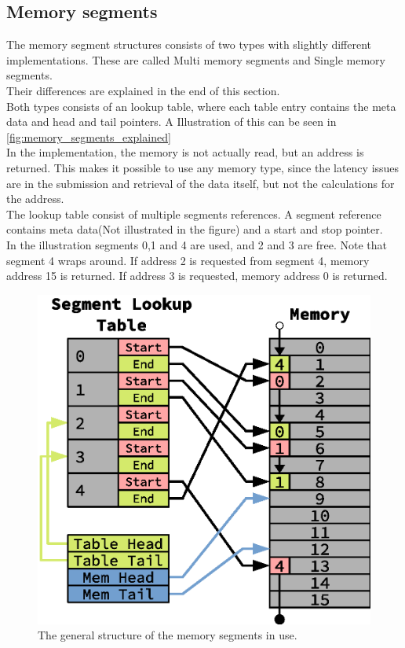 \subsection{Memory segments} \label{subsec:memory_segments}
The memory segment structures consists of two types with slightly different
implementations. These are called Multi memory segments and Single memory
segments.
\\Their differences are explained in the end of this section.\\
Both types consists of an lookup table, where each table entry contains the
meta data and head and tail pointers. A Illustration of this can be seen in
\autoref{fig:memory_segments_explained}\\
In the implementation, the memory is not actually read, but an address is
returned. This makes it possible to use any memory type, since the latency issues
are in the submission and retrieval of the data itself, but not the calculations
for the address.\\
The lookup table consist of multiple segments references. A segment reference
contains meta data(Not illustrated in the figure) and a start and stop pointer.\\
In the illustration segments 0,1 and 4 are used, and 2 and 3 are free. Note that
segment 4 wraps around. If address 2 is requested from segment 4, memory address
15 is returned. If address 3 is requested, memory address 0 is returned.\\
\begin{figure}
	\centering
	\includegraphics[width=\linewidth]{implementation/memory_segments.eps}
	\caption{The general structure of the memory segments in use.}
	\label{fig:memory_segments_explained}
\end{figure}

